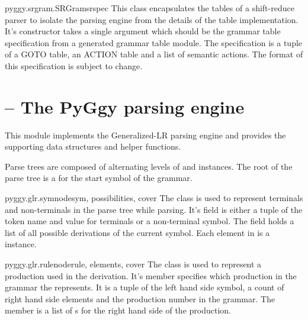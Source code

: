 \begin{classdesc}{pyggy.srgram.SRGram}{srspec}
This class encapsulates the tables of a shift-reduce parser to
isolate the parsing engine from the details of the table implementation.
It's constructor takes a single argument which should be the
grammar table specification from a generated grammar table module.
The specification is a tuple of a GOTO table, an ACTION table and
a list of semantic actions.
The format of this specification is subject to change.
\end{classdesc}



\section{ -- The PyGgy parsing engine}

This module implements the Generalized-LR parsing engine and provides
the supporting data structures and helper functions.


Parse trees are composed of alternating levels of 
and  instances.  The root of the parse tree is
a  for the start symbol of the grammar.

\begin{classdesc}{pyggy.glr.symnode}{sym, possibilities, cover}
The  class is used to represent terminals and non-terminals
in the parse tree while parsing.  It's  field is either
a tuple of the token name and value for terminals or a non-terminal
symbol.  The  field holds a list of all possible
derivations of the current symbol.  Each element in 
is a  instance.
\end{classdesc}

\begin{classdesc}{pyggy.glr.rulenode}{rule, elements, cover}
The  class is used to represent a production used
in the derivation.  It's  member specifies which production
in the grammar the  represents.  It is a tuple
of the left hand side symbol, a count of right hand side elements and
the production number in the grammar.  The  member
is a list of s for the right hand side of the
production.
\end{classdesc}

